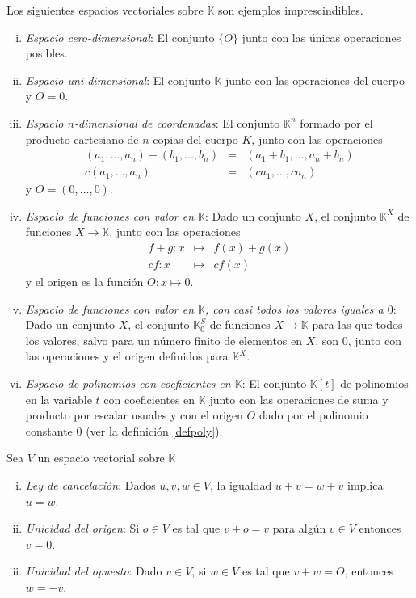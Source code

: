 \begin{ejem}\label{ejem0}
Los siguientes espacios vectoriales sobre $\mathbb{K}$ son ejemplos imprescindibles.
\begin{enumerate}[(i)]
\item \emph{Espacio cero-dimensional}: El conjunto $\{O\}$ junto con las \'unicas operaciones posibles.
\item \emph{Espacio uni-dimensional}: El conjunto $\mathbb{K}$ junto con las operaciones del cuerpo y $O=0$.
\item \emph{Espacio $n$-dimensional de coordenadas}: El conjunto $\mathbb{K}^n$ formado por el producto cartesiano de $n$ copias del cuerpo $K$, junto con las operaciones
\begin{eqnarray*}
(a_1,\ldots,a_n)+(b_1,\ldots,b_n) & = & (a_1+b_1,\ldots,a_n+b_n)\\
c(a_1,\ldots,a_n) & = & (ca_1,\ldots,ca_n)
\end{eqnarray*}
y $O=(0,\ldots,0)$.
\item \emph{Espacio de funciones con valor en $\mathbb{K}$}: Dado un conjunto $X$, el conjunto $\mathbb{K}^X$ de funciones $X\rightarrow \mathbb{K}$, junto con las operaciones
\begin{eqnarray*}
  f+g: x & \mapsto & f(x)+g(x)\\
  cf: x & \mapsto & cf(x)
\end{eqnarray*}
y el origen es la función $O: x\mapsto 0$.
\item \emph{Espacio de funciones con valor en $\mathbb{K}$, con casi todos los valores iguales a $0$}: Dado un conjunto $X$, el conjunto $\mathbb{K}^S_0$ de funciones $X\rightarrow \mathbb{K}$ para las que todos los valores, salvo para un n\'umero finito de elementos en $X$, son $0$, junto con las operaciones y el origen definidos para $\mathbb{K}^X$.
\item \emph{Espacio de polinomios con coeficientes en $\mathbb{K}$}: El conjunto $\mathbb{K}[t]$ de polinomios en la variable $t$ con coeficientes en $\mathbb{K}$ junto con las operaciones de suma y producto por escalar usuales y con el origen $O$ dado por el polinomio constante $0$ (ver la definición \ref{defpoly}).
\end{enumerate} 
\end{ejem}

\begin{prop}
Sea $V$ un espacio vectorial sobre $\mathbb{K}$
\begin{enumerate}[(i)]
  \item \emph{Ley de cancelaci\'on}: Dados $u,v,w\in V$, la igualdad $u+v=w+v$ implica $u=w$.
  \item \emph{Unicidad del origen}: Si $o\in V$ es tal que $v+o=v$ para algún $v\in V$ entonces $v=0$.
  \item \emph{Unicidad del opuesto}: Dado $v\in V$, si $w\in V$ es tal que $v+w=O$, entonces $w=-v$. 
\end{enumerate}
\end{prop}

